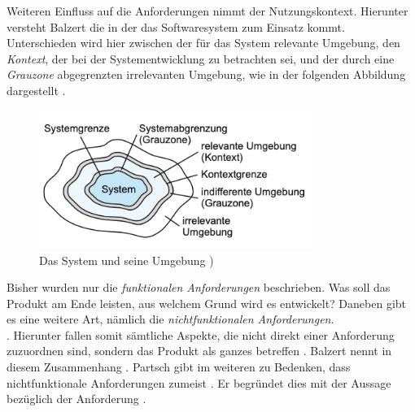Weiteren Einfluss auf die Anforderungen nimmt der Nutzungskontext. Hierunter versteht Balzert die  \citep[][461]{Balzert2010} in der das Softwaresystem zum Einsatz kommt. 
Unterschieden wird hier zwischen der für das System relevante Umgebung, den \textit{Kontext}, der bei der Systementwicklung zu betrachten sei, und der durch eine \textit{Grauzone} abgegrenzten irrelevanten Umgebung, wie in der folgenden Abbildung dargestellt \citep[vgl.][462]{Balzert2010}.

\begin{figure}[h]
  \centering
  \includegraphics[width=0.8\textwidth]{res/Anforderung1.png}
  \caption{Das System und seine Umgebung \citep[][462]{Balzert2010})}
  \label{fig:Systemumgebung}
\end{figure}

Bisher wurden nur die \textit{funktionalen Anforderungen} beschrieben. Was soll das Produkt am Ende leisten, aus welchem Grund wird es entwickelt? Daneben gibt es eine weitere Art, nämlich die \textit{nichtfunktionalen Anforderungen}. \\  \citep[][S. 27 f.]{Partsch2010}.
Hierunter fallen somit sämtliche Aspekte, die nicht direkt einer Anforderung zuzuordnen sind, sondern das Produkt als ganzes betreffen \citep[vgl.][463]{Balzert2010}. Balzert nennt in diesem Zusammenhang  \citep[][463]{Balzert2010}. 
Partsch gibt im weiteren zu Bedenken, dass nichtfunktionale Anforderungen zumeist  \citep[][30]{Partsch2010}. Er begründet dies mit der Aussage bezüglich der Anforderung  \citep[][30]{Partsch2010}.

